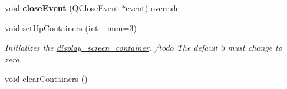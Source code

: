 \begin{DoxyCompactItemize}
void {\bfseries close\+Event} (Q\+Close\+Event $\ast$event) override
\item 
\mbox{\label{classScreen__manager_ae999da71a66db6ce0ce62216fe20863a}} 
void \mbox{\hyperlink{classScreen__manager_ae999da71a66db6ce0ce62216fe20863a}{set\+Up\+Containers}} (int \+\_\+num=3)
\begin{DoxyCompactList}\small\item\em Initializes the \mbox{\hyperlink{classdisplay__screen__container}{display\+\_\+screen\+\_\+container}}. /todo The default 3 must change to zero. \end{DoxyCompactList}\item 
void \mbox{\hyperlink{classScreen__manager_a5896c354d45b0b4142a76b26f7081787}{clear\+Containers}} ()
\end{DoxyCompactItemize}
